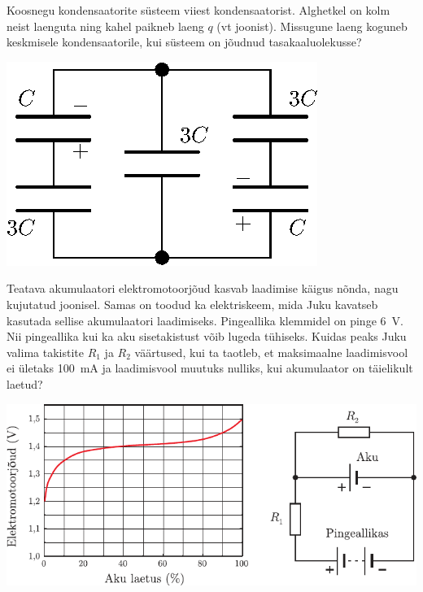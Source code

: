 \documentclass[10pt]{article}
\begin{document}
{\bigskip


Koosnegu kondensaatorite süsteem viiest kondensaatorist. Alghetkel on kolm neist laenguta ning kahel paikneb laeng $q$ (vt joonist). Missugune laeng koguneb keskmisele kondensaatorile, kui süsteem on jõudnud tasakaaluolekusse?

\begin{center}
	\includegraphics[width=0.42\linewidth]{2009-v3g-03-G_kondensaatorid.eps}
\end{center}
\probend
\bigskip


Teatava akumulaatori elektromotoorjõud kasvab laadimise käigus nõnda, nagu kujutatud joonisel. Samas on toodud ka elektriskeem, mida Juku kavatseb kasutada sellise akumulaatori laadimiseks. Pingeallika klemmidel on pinge \SI{6}{V}. Nii pingeallika kui ka aku sisetakistust võib lugeda tühiseks. Kuidas peaks Juku valima takistite $R_1$ ja $R_2$ väärtused, kui ta taotleb, et maksimaalne laadimisvool ei ületaks \SI{100}{mA} ja laadimisvool muutuks nulliks, kui akumulaator on täielikult laetud? 

\begin{center}
	\includegraphics[width=\linewidth]{2008-v2g-08-yl}
\end{center}
\probend
\bigskip

}
\end{document}
